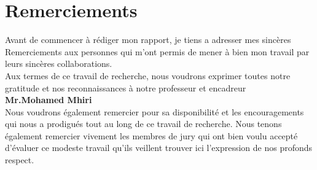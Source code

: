 \cleardoublepage
\section*{Remerciements}
\vspace{1.0in}
\begin{center}
 Avant de commencer à rédiger mon rapport, je tiens a adresser mes
sincères Remerciements aux personnes qui m'ont permis de mener à bien mon
travail par leurs sincères collaborations.\\
Aux termes de ce travail de recherche, nous voudrons exprimer toutes 
notre gratitude et nos reconnaissances à notre professeur et encadreur
\\[0.2in]
 \textbf{Mr.Mohamed Mhiri}
\\[0.2in]
Nous voudrons également remercier pour sa disponibilité et les
encouragements qui nous a prodigués tout au long de ce travail
de recherche.
Nous tenons également remercier vivement les membres de jury qui 
ont bien voulu accepté d'évaluer ce modeste travail qu'ils 
veillent trouver ici l'expression de nos profonds respect.\\
\end{center}


